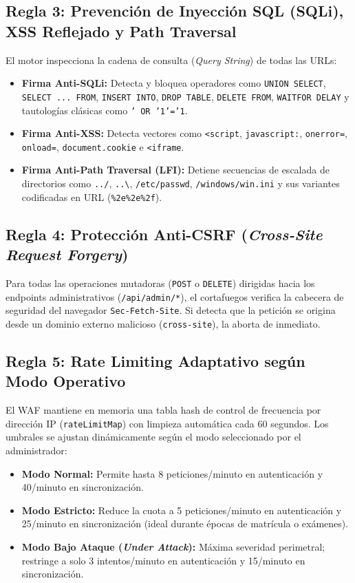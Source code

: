\documentclass[12pt,a4paper,oneside]{report}
\begin{document}
\subsection{Regla 3: Prevención de Inyección SQL (SQLi), XSS Reflejado y Path Traversal}
El motor inspecciona la cadena de consulta (\textit{Query String}) de todas las URLs:
\begin{itemize}[leftmargin=1.0cm]
  \item \textbf{Firma Anti-SQLi:} Detecta y bloquea operadores como \texttt{UNION SELECT}, \texttt{SELECT ... FROM}, \texttt{INSERT INTO}, \texttt{DROP TABLE}, \texttt{DELETE FROM}, \texttt{WAITFOR DELAY} y tautologías clásicas como \texttt{' OR '1'='1}.
  \item \textbf{Firma Anti-XSS:} Detecta vectores como \texttt{<script}, \texttt{javascript:}, \texttt{onerror=}, \texttt{onload=}, \texttt{document.cookie} e \texttt{<iframe}.
  \item \textbf{Firma Anti-Path Traversal (LFI):} Detiene secuencias de escalada de directorios como \texttt{../}, \texttt{..\textbackslash}, \texttt{/etc/passwd}, \texttt{/windows/win.ini} y sus variantes codificadas en URL (\texttt{\%2e\%2e\%2f}).
\end{itemize}

\subsection{Regla 4: Protección Anti-CSRF (\textit{Cross-Site Request Forgery})}
Para todas las operaciones mutadoras (\texttt{POST} o \texttt{DELETE}) dirigidas hacia los endpoints administrativos (\texttt{/api/admin/*}), el cortafuegos verifica la cabecera de seguridad del navegador \texttt{Sec-Fetch-Site}. Si detecta que la petición se origina desde un dominio externo malicioso (\texttt{cross-site}), la aborta de inmediato.

\subsection{Regla 5: Rate Limiting Adaptativo según Modo Operativo}
El WAF mantiene en memoria una tabla hash de control de frecuencia por dirección IP (\texttt{rateLimitMap}) con limpieza automática cada 60 segundos. Los umbrales se ajustan dinámicamente según el modo seleccionado por el administrador:
\begin{itemize}[leftmargin=1.0cm]
  \item \textbf{Modo Normal:} Permite hasta 8 peticiones/minuto en autenticación y 40/minuto en sincronización.
  \item \textbf{Modo Estricto:} Reduce la cuota a 5 peticiones/minuto en autenticación y 25/minuto en sincronización (ideal durante épocas de matrícula o exámenes).
  \item \textbf{Modo Bajo Ataque (\textit{Under Attack}):} Máxima severidad perimetral; restringe a solo 3 intentos/minuto en autenticación y 15/minuto en sincronización.
\end{itemize}
\end{document}
